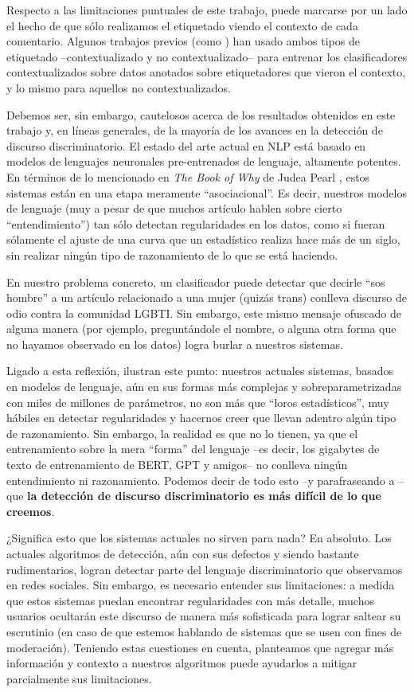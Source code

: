 Respecto a las limitaciones puntuales de este trabajo, puede marcarse por un lado el hecho de que sólo realizamos el etiquetado viendo el contexto de cada comentario. Algunos trabajos previos (como \cite{pavlopoulos2020toxicity}) han usado ambos tipos de etiquetado --contextualizado y no contextualizado-- para entrenar los clasificadores contextualizados sobre datos anotados sobre etiquetadores que vieron el contexto, y lo mismo para aquellos no contextualizados.

Debemos ser, sin embargo, cautelosos acerca de los resultados obtenidos en este trabajo y, en líneas generales, de la mayoría de los avances en la detección de discurso discriminatorio. El estado del arte actual en NLP está basado en modelos de lenguajes neuronales pre-entrenados de lenguaje, altamente potentes. En términos de lo mencionado en \emph{The Book of Why} de Judea Pearl \cite{pearl2018book}, estos sistemas están en una etapa meramente ``asociacional''. Es decir, nuestros modelos de lenguaje (muy a pesar de que muchos artículo hablen sobre cierto ``entendimiento'') tan sólo detectan regularidades en los datos, como si fueran sólamente el ajuste de una curva que un estadístico realiza hace más de un siglo, sin realizar ningún tipo de razonamiento de lo que se está haciendo.

En nuestro problema concreto, un clasificador puede detectar que decirle ``sos hombre'' a un artículo relacionado a una mujer (quizás trans) conlleva discurso de odio contra la comunidad LGBTI. Sin embargo, este mismo mensaje ofuscado de alguna manera (por ejemplo, preguntándole el nombre, o alguna otra forma que no hayamos observado en los datos) logra burlar a nuestros sistemas.

Ligado a esta reflexión, \cite{bender-koller-2020-climbing} ilustran este punto: nuestros actuales sistemas, basados en modelos de lenguaje, aún en sus formas más complejas y sobreparametrizadas con miles de millones de parámetros, no son más que ``loros estadísticos'', muy hábiles en detectar regularidades y hacernos creer que llevan adentro algún tipo de razonamiento. Sin embargo, la realidad es que no lo tienen, ya que el entrenamiento sobre la mera ``forma'' del lenguaje --es decir, los gigabytes de texto de entrenamiento de BERT, GPT y amigos-- no conlleva ningún entendimiento ni razonamiento. Podemos decir de todo esto --y parafraseando a \citet{mitchell2021ai}-- que \textbf{la detección de discurso discriminatorio es más difícil de lo que creemos}.

¿Significa esto que los sistemas actuales no sirven para nada? En absoluto. Los actuales algoritmos de detección, aún con sus defectos y siendo bastante rudimentarios, logran detectar parte del lenguaje discriminatorio que observamos en redes sociales. Sin embargo, es necesario entender sus limitaciones: a medida que estos sistemas puedan encontrar regularidades con más detalle, muchos usuarios ocultarán este discurso de manera más sofisticada para lograr saltear su escrutinio (en caso de que estemos hablando de sistemas que se usen con fines de moderación). Teniendo estas cuestiones en cuenta, planteamos que agregar más información y contexto a nuestros algoritmos puede ayudarlos a mitigar parcialmente sus limitaciones.
